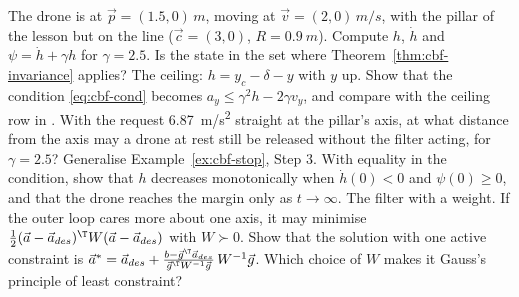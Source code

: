 \begin{exercises}
\exercise[1] The drone is at $\vec p = (1.5, 0)\,\si{m}$, moving at $\vec v = (2, 0)\,\si{m/s}$, with the pillar of the lesson but on the line ($\vec c = (3, 0)$, $R = \SI{0.9}{m}$). Compute $h$, $\dot h$ and $\psi = \dot h + \gamma h$ for $\gamma = 2.5$. Is the state in the set where Theorem~\ref{thm:cbf-invariance} applies?
\exercise[1] The ceiling: $h = y_c - \delta - y$ with $y$ up. Show that the condition \cref{eq:cbf-cond} becomes $a_y \le \gamma^2 h - 2\gamma v_y$, and compare with the ceiling row in .
\exercise[1] With the request \SI{6.87}{m/s^2} straight at the pillar's axis, at what distance from the axis may a drone at rest still be released without the filter acting, for $\gamma = 2.5$?
\exercise[2] Generalise Example~\ref{ex:cbf-stop}, Step 3. With equality in the condition, show that $h$ decreases monotonically when $\dot h(0) < 0$ and $\psi(0) \ge 0$, and that the drone reaches the margin only as $t \to \infty$.
\exercise[2] The filter with a weight. If the outer loop cares more about one axis, it may minimise $\tfrac12(\vec a - \vec a_{des})^\T W(\vec a - \vec a_{des})$ with $W \succ 0$. Show that the solution with one active constraint is $\vec a^* = \vec a_{des} + \frac{b - \vec g^\T\vec a_{des}}{\vec g^\T W^{-1}\vec g}\,W^{-1}\vec g$. Which choice of $W$ makes it Gauss's principle of least constraint?

\end{exercises}
